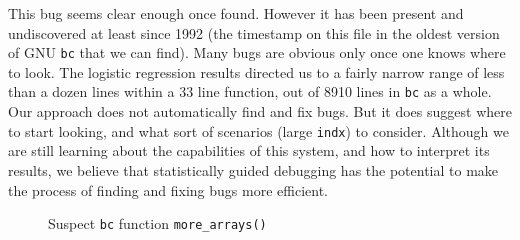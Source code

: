 This bug seems clear enough once found.  However it has been present
and undiscovered at least since 1992 (the timestamp on this file in
the oldest version of GNU \texttt{bc} that we can find).  Many bugs
are obvious only once one knows where to look.  The logistic
regression results directed us to a fairly narrow range of less than a
dozen lines within a 33 line function, out of 8910 lines in
\texttt{bc} as a whole.  Our approach does not automatically find and
fix bugs.  But it does suggest where to start looking, and what sort
of scenarios (large \texttt{indx}) to consider.  Although we are still
learning about the capabilities of this system, and how to interpret
its results, we believe that statistically guided debugging has the
potential to make the process of finding and fixing bugs more efficient.

\begin{figure}
  \centering
  \small
  \caption{Suspect \texttt{bc} function \texttt{more\_arrays()}}
  \label{fig:bc:more-arrays}
\end{figure}
